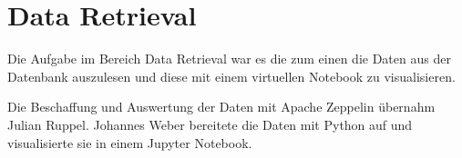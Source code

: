 \section{Data Retrieval}
Die Aufgabe im Bereich Data Retrieval war es die zum einen die Daten aus der Datenbank auszulesen und diese mit einem virtuellen Notebook zu visualisieren.

Die Beschaffung und Auswertung der Daten mit Apache Zeppelin übernahm Julian Ruppel.
Johannes Weber bereitete die Daten mit Python auf und visualisierte sie in einem Jupyter Notebook.


